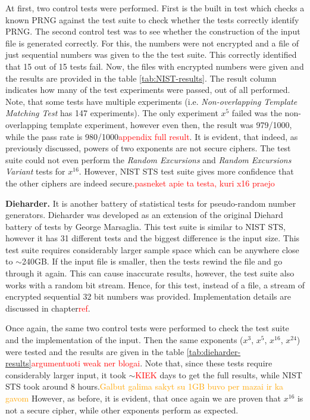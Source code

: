 \documentclass{Resources/UoBLab1}
\theoremstyle{definition}
\begin{document}
At first, two control tests were performed. First is the built in test which checks a known PRNG against the test suite to check whether the tests correctly identify PRNG. The second control test was to see whether the construction of the input file is generated correctly. For this, the numbers were not encrypted and a file of just sequential numbers was given to the the test suite. This correctly identified that 15 out of 15 tests fail. Now, the files with encrypted numbers were given and the results are provided in the table \ref{tab:NIST-results}. The result column indicates how many of the test experiments were passed, out of all performed. Note, that some tests have multiple experiments (i.e. \textit{Non-overlapping Template Matching Test} has 147 experiments). The only experiment $x^5$ failed was the non-overlapping template experiment, however even then, the result was 979/1000, while the pass rate is 980/1000\textcolor{red}{appendix full result}. It is evident, that indeed, as previously discussed, powers of two exponents are not secure ciphers. The test suite could not even perform the \textit{Random Excursions} and \textit{Random Excursions Variant} tests for $x^{16}$. However, NIST STS test suite gives more confidence that the other ciphers are indeed secure.\textcolor{red}{pasneket apie ta testa, kuri x16 praejo}\medskip

\noindent\textbf{Dieharder.} It is another battery of statistical tests for pseudo-random number generators. Dieharder was developed as an extension of the original Diehard battery of tests by George Marsaglia\cite{Diehard}. This test suite is similar to NIST STS, however it has 31 different tests and the biggest difference is the input size. This test suite requires considerably larger sample space which can be anywhere close to $\sim$240GB. If the input file is smaller, then the tests rewind the file and go through it again. This can cause inaccurate results, however, the test suite also works with a random bit stream. Hence, for this test, instead of a file, a stream of encrypted sequential 32 bit numbers was provided. Implementation details are discussed in chapter\textcolor{red}{ref}.

Once again, the same two control tests were performed to check the test suite and the implementation of the input. Then the same exponents ($x^3$, $x^5$, $x^{16}$, $x^{24}$) were tested and the results are given in the table \ref{tab:dieharder-results}\textcolor{red}{argumentuoti weak ner blogai}. Note that, since these tests require considerably larger input, it took $\sim$\textcolor{red}{KIEK} days to get the full results, while NIST STS took around 8 hours.\textcolor{orange}{Galbut galima sakyt su 1GB buvo per mazai ir ka gavom} However, as before, it is evident, that once again we are proven that $x^{16}$ is not a secure cipher, while other exponents perform as expected.
\end{document}

